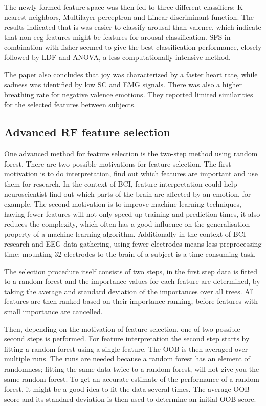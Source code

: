 \npar

The newly formed feature space was then fed to three different classifiers: K-nearest neighbors, Multilayer perceptron and Linear discriminant function. The results indicated that is was easier to classify arousal than valence, which indicate that non-eeg features might be features for arousal classification. SFS in combination with fisher seemed to give the best classification performance, closely followed by LDF and ANOVA, a less computationally intensive method.

\npar

The paper also concludes that joy was characterized by a faster heart rate, while sadness was identified by low SC and EMG signals. There was also a higher breathing rate for negative valence emotions. They reported limited similarities for the selected features between subjects.

\subsection{Advanced RF feature selection}
\label{rfmethod}
One advanced method for feature selection is the two-step method using random forest\citep{rfPaper}. There are two possible motivations for feature selection. The first motivation is to do interpretation, find out which features are important and use them for research. In the context of BCI, feature interpretation could help neuroscientist find out which parts of the brain are affected by an emotion, for example. The second motivation is to improve machine learning techniques, having fewer features will not only speed up training and prediction times, it also reduces the complexity, which often has a good influence on the generalisation property of a machine learning algorithm. Additionally in the context of BCI research and EEG data gathering, using fewer electrodes means less preprocessing time; mounting 32 electrodes to the brain of a subject is a time consuming task.

\npar

The selection procedure itself consists of two steps, in the first step data is fitted to a random forest and the importance values for each feature are determined, by taking the average and standard deviation of the importances over all trees. All features are then ranked based on their importance ranking, before features with small importance are cancelled. 

\npar

Then, depending on the motivation of feature selection, one of two possible second steps is performed. For feature interpretation the second step starts by fitting a random forest using a single feature. The OOB is then averaged over multiple runs. The runs are needed because a random forest has an element of randomness; fitting the same data twice to a random forest, will not give you the same random forest. To get an accurate estimate of the performance of a random forest, it might be a good idea to fit the data several times. The average OOB score and its standard deviation is then used to determine an initial OOB score.

